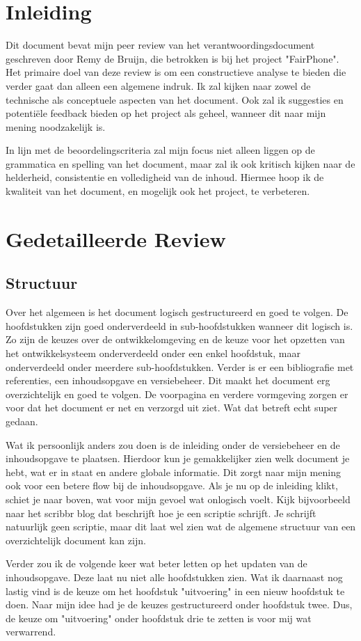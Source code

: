 \documentclass[a4paper]{report}
\begin{document}
\chapter{Inleiding}
Dit document bevat mijn peer review van het verantwoordingsdocument geschreven door Remy de Bruijn, die betrokken is bij het project "FairPhone". 
Het primaire doel van deze review is om een constructieve analyse te bieden die verder gaat dan alleen een algemene indruk. 
Ik zal kijken naar zowel de technische als conceptuele aspecten van het document. Ook zal ik suggesties en potentiële feedback bieden op het project als geheel, wanneer dit naar mijn mening noodzakelijk is.
\par \smallskip
In lijn met de beoordelingscriteria zal mijn focus niet alleen liggen op de grammatica en spelling van het document, maar zal ik ook kritisch kijken naar de helderheid, consistentie en volledigheid van de inhoud.
Hiermee hoop ik de kwaliteit van het document, en mogelijk ook het project, te verbeteren.
\chapter{Gedetailleerde Review}
\section{Structuur}
Over het algemeen is het document logisch gestructureerd en goed te volgen. 
De hoofdstukken zijn goed onderverdeeld in sub-hoofdstukken wanneer dit logisch is.
Zo zijn de keuzes over de ontwikkelomgeving en de keuze voor het opzetten van het ontwikkelsysteem onderverdeeld onder een enkel hoofdstuk, maar onderverdeeld onder meerdere sub-hoofdstukken.
Verder is er een bibliografie met referenties, een inhoudsopgave en versiebeheer. Dit maakt het document erg overzichtelijk en goed te volgen.
De voorpagina en verdere vormgeving zorgen er voor dat het document er net en verzorgd uit ziet. Wat dat betreft echt super gedaan. 
\par\smallskip
Wat ik persoonlijk anders zou doen is de inleiding onder de versiebeheer en de inhoudsopgave te plaatsen. 
Hierdoor kun je gemakkelijker zien welk document je hebt, wat er in staat en andere globale informatie. 
Dit zorgt naar mijn mening ook voor een betere flow bij de inhoudsopgave. Als je nu op de inleiding klikt, schiet je naar boven, wat voor mijn gevoel wat onlogisch voelt. 
Kijk bijvoorbeeld naar het scribbr blog dat beschrijft hoe je een scriptie schrijft\cite{scribbrThesis}. 
Je schrijft natuurlijk geen scriptie, maar dit laat wel zien wat de algemene structuur van een overzichtelijk document kan zijn.
\par\smallskip
Verder zou ik de volgende keer wat beter letten op het updaten van de inhoudsopgave. Deze laat nu niet alle hoofdstukken zien.
Wat ik daarnaast nog lastig vind is de keuze om het hoofdstuk "uitvoering" in een nieuw hoofdstuk te doen. 
Naar mijn idee had je de keuzes gestructureerd onder hoofdstuk twee. Dus, de keuze om "uitvoering" onder hoofdstuk drie te zetten is voor mij wat verwarrend. 
\end{document}
